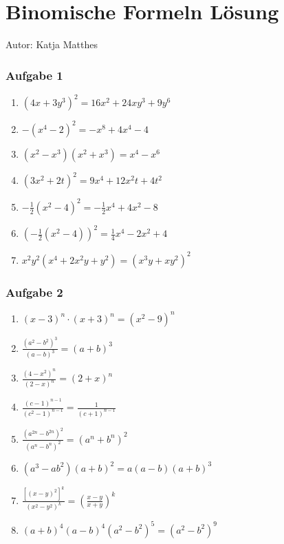\section{Binomische Formeln Lösung}
Autor: Katja Matthes

\subsubsection{Aufgabe 1} 
\begin{enumerate}
	\item \quad $ (4x + 3y^3)^2=16x^2 + 24xy^3 + 9y^6 $					%
	\item \quad $ -(x^4-2)^2=-x^8 + 4x^4 - 4 $								%
	\item \quad $ (x^2-x^3)(x^2+x^3) =x^4 - x^6 $											%
	\item \quad $ (3x^2+2t)^2 =9x^4 + 12x^2t + 4t^2 $					%
	\item \quad $ -\frac{1}{2}(x^2-4)^2 =-\frac{1}{2}x^4 + 4x^2 - 8 $		%
	\item \quad $ \left(-\frac{1}{2}(x^2-4)\right)^2 =\frac{1}{4}x^4 -2x^2 + 4 $			%
	\item \quad $ x^2y^2(x^4+2x^2y+y^2) =(x^3y+xy^2)^2 $									%
\end{enumerate}

\subsubsection{Aufgabe 2} 
\begin{enumerate}
	\item \quad $ (x-3)^n \cdot (x+3)^n =(x^2 - 9)^n $										%
	\item \quad $ \frac{(a^2-b^2)^3}{(a-b)^3}=(a+b)^3 $												%
	\item \quad $ \frac{(4-x^2)^n}{(2-x)^n}=(2+x)^n $												%
	\item \quad $ \frac{(c-1)^{n-1}}{(c^2-1)^{n-1}} =\frac{1}{(c+1)^{n-1}} $					%
	\item \quad $ \frac{(a^{2n}-b^{2n})^2}{(a^n-b^n)^2} =(a^n+b^n)^2 $										%
	\item \quad $ (a^3 - ab^2)(a+b)^2=a(a-b)(a+b)^3 $									%
	\item \quad $ \frac{[(x-y)^2]^k}{(x^2-y^2)^k} =\left(\frac{x-y}{x+y}\right)^k $%
	\item \quad $ (a+b)^4(a-b)^4(a^2-b^2)^5=(a^2 - b^2)^9 $									%
\end{enumerate}

